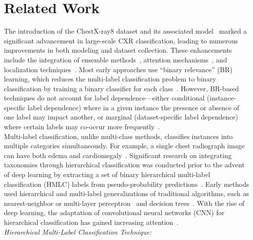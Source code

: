 \documentclass[authoryear,preprint,review,12pt]{elsarticle}
\begin{document}
\section{Related Work}\label{sec:taxonomy.relatedwork}
The introduction of the ChestX-ray8 dataset and its associated model~\cite{wang_ChestXRay8_2017} marked a significant advancement in large-scale CXR classification, leading to numerous improvements in both modeling and dataset collection. These enhancements include the integration of ensemble methods~\cite{islam_Abnormality_2017}, attention mechanisms~\cite{guan_Diagnose_2018,liu_SDFN_2019}, and localization techniques~\cite{cai_Iterative_2018,guendel_MultiTask_2019,li_Thoracic_2018,yan_Weakly_2018}. Most early approaches use ``binary relevance'' (BR) learning, which reduces the multi-label classification problem to binary classification by training a binary classifier for each class~\cite{zhang_Review_2014}. However, BR-based techniques do not account for label dependence---either conditional (instance-specific label dependence) where in a given instance the presence or absence of one label may impact another, or marginal (dataset-specific label dependence) where certain labels may co-occur more frequently~\cite{dembczynski_Label_2012}.
\\
Multi-label classification, unlike multi-class methods, classifies instances into multiple categories simultaneously. For example, a single chest radiograph image can have both edema and cardiomegaly~\cite{harvey_Standardised_2019,tsoumakas_MultiLabel_2007}. Significant research on integrating taxonomies through hierarchical classification was conducted prior to the advent of deep learning by extracting a set of binary hierarchical multi-label classification (HMLC) labels from pseudo-probability predictions~\cite{bi_BayesOptimal_2015}. Early methods used hierarchical and multi-label generalizations of traditional algorithms, such as nearest-neighbor or multi-layer perceptron~\cite{pourghassem_ContentBased_2008} and decision trees~\cite{dimitrovski_Hierarchical_2011}. With the rise of deep learning, the adaptation of convolutional neural networks (CNN) for hierarchical classification has gained increasing attention~\cite{guo_CNNRNN_2018,kowsari_HDLTex_2017,redmon_YOLO9000_2017,roy_TreeCNN_2020}.
\\
\textit{Hierarchical Multi-Label Classification Technique: }
\end{document}
